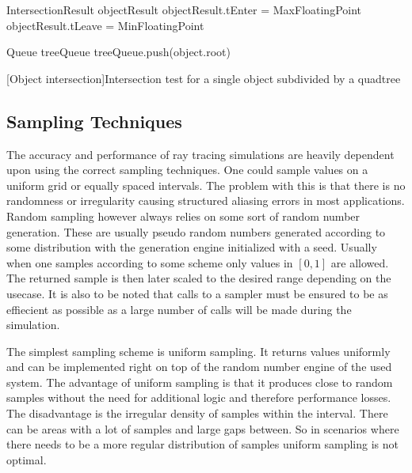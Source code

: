 \documentclass[a4paper,10pt]{article}
\begin{document}
    \begin{algorithm}
        \label{alg:object_intersect}
        \SetAlgoLined
        IntersectionResult objectResult\;
        objectResult.tEnter = MaxFloatingPoint\;
        objectResult.tLeave = MinFloatingPoint\;

        Queue treeQueue\;
        treeQueue.push(object.root)\;


        \caption{[Object intersection]Intersection test for a single object subdivided by a quadtree}
    \end{algorithm}


    \subsection{Sampling Techniques} \label{sec:sampling}

    The accuracy and performance of ray tracing simulations are heavily dependent upon
    using the correct sampling techniques.
    One could sample values on a uniform grid or equally spaced intervals.
    The problem with this is that there is no randomness or irregularity
    causing structured aliasing errors in most applications. 
    Random sampling however always relies on some sort of random number generation.
    These are usually pseudo random numbers generated according to some
    distribution with the generation engine initialized with a seed.
    Usually when one samples according to some scheme only values in 
    $[0,1]$ are allowed.
    The returned sample is then later scaled to the desired range depending
    on the usecase.
    It is also to be noted that calls to a sampler must be ensured to
    be as effiecient as possible as a large number of calls will be
    made during the simulation.

    The simplest sampling scheme is uniform sampling.
    It returns values uniformly and can be implemented right on top of
    the random number engine of the used system.
    The advantage of uniform sampling is that it produces close to random
    samples without the need for additional logic and therefore
    performance losses.
    The disadvantage is the irregular density of samples within the interval.
    There can be areas with a lot of samples and large gaps between.
    So in scenarios where there needs to be a more regular distribution
    of samples uniform sampling is not optimal.
\end{document}
